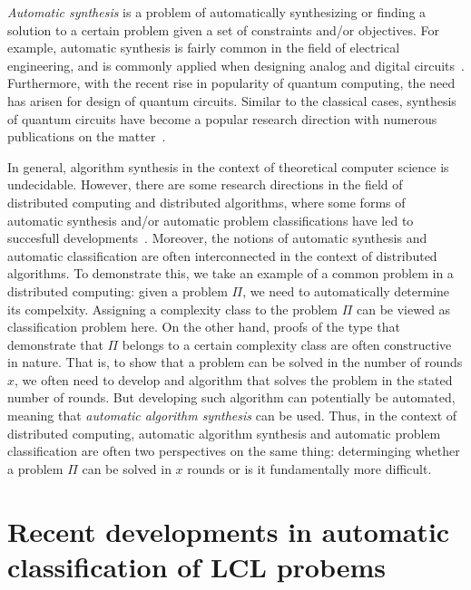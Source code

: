 \emph{Automatic synthesis} is a problem of automatically
synthesizing or finding
a solution to a certain problem given a set of constraints and/or
objectives. For example, automatic synthesis is fairly common
in the field of electrical engineering, and is commonly
applied when designing analog and digital circuits~\cite{synthesis_,
synthesis_autoAx}. Furthermore, with the recent rise in popularity
of quantum computing, the need has arisen for design of quantum
circuits. Similar to the classical cases, synthesis of
quantum circuits have become a popular research direction
with numerous publications on the matter~\cite{synthesis_Khan2017,
synthesis_Meuli2018, synthesis_Miller2003}.

In general, algorithm synthesis in the context of theoretical
computer science is undecidable. However, there are some
research directions in the field of distributed computing and
distributed algorithms, where some forms of automatic synthesis and/or
automatic problem classifications have led to succesfull
developments~\cite{Balliu2018, da-synthesis_Rybicki2015,
da-synthesis_Klinkhamer2016,
da-synthesis_Hirvonen2017, da-synthesis_Fathiyeh2015, da-synthesis_Dolev2016,
Chang2017, Brandt2017, da-synthesis_Bloem2016}. Moreover,
the notions of automatic synthesis and automatic classification are
often interconnected in the context of distributed algorithms.
To demonstrate this, we take an example of a common problem in
a distributed computing: given a problem $\Pi$, we need to
automatically determine its compelxity. Assigning a complexity
class to the problem $\Pi$ can be viewed as classification
problem here. On the other hand, proofs of the type that
demonstrate that $\Pi$ belongs to a certain complexity class
are often constructive in nature. That is, to show that a
problem can be solved in the number of rounds $x$, we
often need to develop and algorithm that solves the problem
in the stated number of rounds. But developing such algorithm
can potentially be automated, meaning that \emph{automatic
algorithm synthesis} can be used. Thus, in the context of
distributed computing, automatic algorithm
synthesis and automatic problem classification are often two perspectives
on the same thing: determinging whether a problem $\Pi$ can be solved
in $x$ rounds or is it fundamentally more difficult.

\section{Recent developments in automatic classification of LCL probems}

